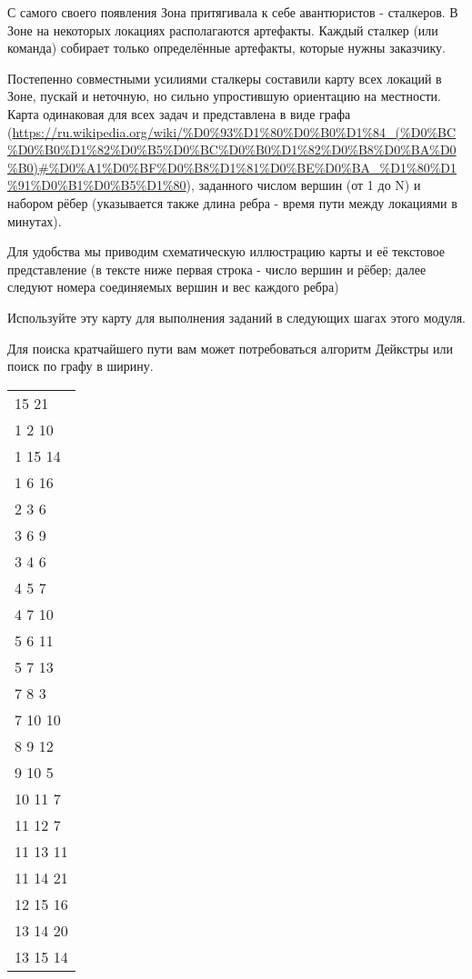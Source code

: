 С самого своего появления Зона притягивала к себе авантюристов - сталкеров. В Зоне на некоторых локациях располагаются артефакты. Каждый сталкер (или команда) собирает только определённые артефакты, которые нужны заказчику.

Постепенно совместными усилиями сталкеры составили карту всех локаций в Зоне, пускай и неточную, 
    но сильно упростившую ориентацию на местности. Карта одинаковая для всех задач и представлена в виде графа
    (\url{https://ru.wikipedia.org/wiki/%D0%93%D1%80%D0%B0%D1%84_(%D0%BC%D0%B0%D1%82%D0%B5%D0%BC%D0%B0%D1%82%D0%B8%D0%BA%D0%B0)#%D0%A1%D0%BF%D0%B8%D1%81%D0%BE%D0%BA_%D1%80%D1%91%D0%B1%D0%B5%D1%80}), заданного числом вершин (от 1 до N) и набором рёбер (указывается также длина ребра - время пути между локациями в минутах).

Для удобства мы приводим схематическую иллюстрацию карты и её текстовое представление (в тексте ниже первая строка - число вершин и рёбер; далее следуют номера соединяемых вершин и вес каждого ребра)

Используйте эту карту для выполнения заданий в следующих шагах этого модуля.

Для поиска кратчайшего пути вам может потребоваться алгоритм Дейкстры или поиск по графу в ширину.


\begin{longtable}{l}
    15 21 \\
    1 2 10 \\
    1 15 14 \\
    1 6 16 \\ 
    2 3 6 \\
    3 6 9 \\
    3 4 6 \\
    4 5 7 \\
    4 7 10 \\
    5 6 11 \\
    5 7 13 \\
    7 8 3 \\
    7 10 10 \\
    8 9 12 \\
    9 10 5 \\
    10 11 7 \\
    11 12 7 \\
    11 13 11 \\
    11 14 21 \\
    12 15 16 \\
    13 14 20 \\
    13 15 14 \\
\end{longtable}

